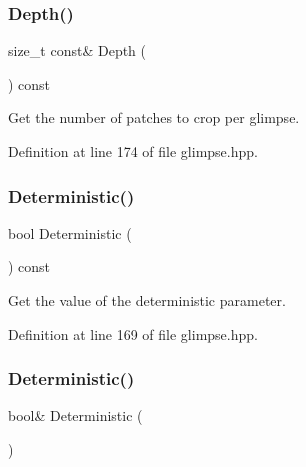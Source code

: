 \subsubsection{Depth()}
{\footnotesize\ttfamily size\+\_\+t const\& Depth (\begin{DoxyParamCaption}{ }\end{DoxyParamCaption}) const\hspace{0.3cm}{\ttfamily [inline]}}



Get the number of patches to crop per glimpse. 



Definition at line 174 of file glimpse.\+hpp.

\mbox{\label{classmlpack_1_1ann_1_1Glimpse_a9f4103707f4d199ce5594d239b60443e}} 
\subsubsection{Deterministic()\hspace{0.1cm}{\footnotesize\ttfamily [1/2]}}
{\footnotesize\ttfamily bool Deterministic (\begin{DoxyParamCaption}{ }\end{DoxyParamCaption}) const\hspace{0.3cm}{\ttfamily [inline]}}



Get the value of the deterministic parameter. 



Definition at line 169 of file glimpse.\+hpp.

\mbox{\label{classmlpack_1_1ann_1_1Glimpse_a42d4ee3da432cff20d3a41b8b1ec801c}} 
\subsubsection{Deterministic()\hspace{0.1cm}{\footnotesize\ttfamily [2/2]}}
{\footnotesize\ttfamily bool\& Deterministic (\begin{DoxyParamCaption}{ }\end{DoxyParamCaption})\hspace{0.3cm}{\ttfamily [inline]}}



